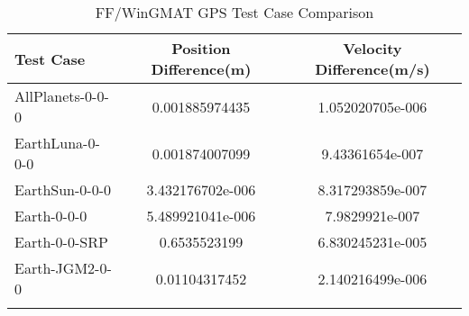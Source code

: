 \begin{table}[htbp!]
\centering
\caption{ FF/WinGMAT GPS Test Case Comparison}
      \begin{tabular}{lcc}
      \hline\hline
          Test Case & Position Difference(m) & Velocity Difference(m/s) \\
         \hline
         AllPlanets-0-0-0 & 0.001885974435 & 1.052020705e-006 \\
         EarthLuna-0-0-0 & 0.001874007099 & 9.43361654e-007 \\
         EarthSun-0-0-0 & 3.432176702e-006 & 8.317293859e-007 \\
         Earth-0-0-0 & 5.489921041e-006 & 7.9829921e-007 \\
         Earth-0-0-SRP & 0.6535523199 & 6.830245231e-005 \\
         Earth-JGM2-0-0 & 0.01104317452 & 2.140216499e-006 \\
      \hline\hline
      \label{Table: GPS FF-WinGMAT Table} 
\end{tabular}
\end{table}
